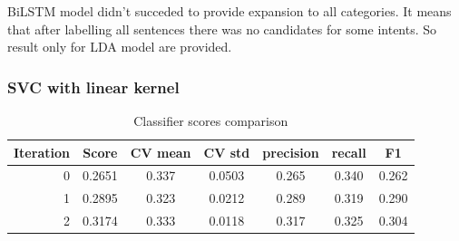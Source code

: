 \documentclass[11pt]{article}
\begin{document}
BiLSTM model didn't succeded to provide expansion to all categories. It means that after labelling all sentences there was no candidates for some intents. So result only for LDA model are provided.


  
\subsubsection{SVC with linear kernel}


\begin{table}[htb]
\begin{center}
\begin{tabular}{ |r|c|c|c|c|c|c| }
\hline
Iteration 	& Score  & CV mean & CV std & precision & recall & F1 \\ \hline
0			& 0.2651 & 0.337   & 0.0503 & 0.265 	& 0.340  & 0.262 \\ \hline
1			& 0.2895 & 0.323   & 0.0212 & 0.289 	& 0.319  & 0.290 \\ \hline
2 			& 0.3174 & 0.333   & 0.0118 & 0.317 	& 0.325  & 0.304 \\ \hline
\end{tabular}
\caption{Classifier scores comparison}
\label{lin_gen_scores}
\end{center}
\end{table}
\FloatBarrier
\end{document}
